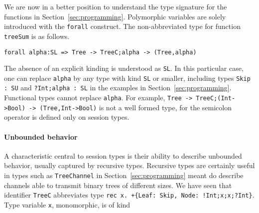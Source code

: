 We are now in a better position to understand the type signature for
the functions in Section~\ref{sec:programming}.  Polymorphic variables
are solely introduced with the \lstinline|forall| construct. The
non-abbreviated type for function \lstinline|treeSum| is as follows.
%
\begin{lstlisting}
forall alpha:SL => Tree -> TreeC;alpha -> (Tree,alpha)
\end{lstlisting}
%
The absence of an explicit kinding is understood as \lstinline|SL|. In
this particular case, one can replace \lstinline|alpha| by any type
with kind \lstinline|SL| or smaller, including types
\lstinline|Skip : SU| and \lstinline|?Int;alpha : SL| in the examples
in Section~\ref{sec:programming}. Functional types cannot replace
\lstinline|alpha|. For example,
%
\lstinline|Tree -> TreeC;(Int->Bool) -> (Tree,Int->Bool)|
is not a well formed type, for the semicolon operator is defined only
on session types.

\paragraph{Unbounded behavior}

A characteristic central to session types is their ability to describe
unbounded behavior, usually captured by recursive types. Recursive
types are certainly useful in types such as \lstinline|TreeChannel| in
Section~\ref{sec:programming} meant do describe channels able to
transmit binary trees of different sizes. We have seen that identifier
\lstinline|TreeC| abbreviates type
%
\lstinline|rec x. +{Leaf: Skip, Node: !Int;x;x;?Int}|.  Type variable
\lstinline|x|, monomorphic, is of kind

